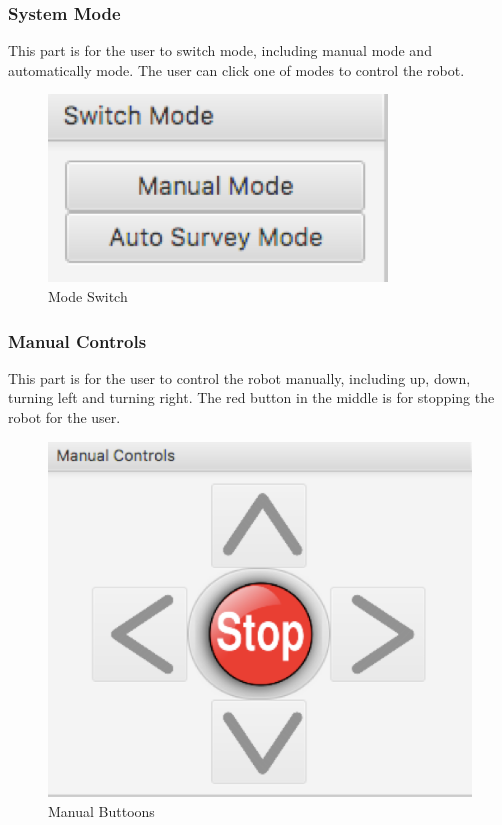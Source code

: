 \documentclass[10pt,a4paper,titlepage]{article}
\begin{document}
  \subsubsection{System Mode} 
  This part is for the user to switch mode, including manual mode and automatically mode. The user can click one of modes to control the robot.
  \begin{figure}[H] 
  \includegraphics[width=\linewidth]{mode.png}  %
  \caption{Mode Switch} 
  \label{fig:Mode Switch}               
  \end{figure} 
  
  \subsubsection{  Manual Controls} 
This part is for the user to control the robot manually, including up, down, turning left and turning right. The red button in the middle is for stopping the robot for the user.
  \begin{figure}[H] 
  \includegraphics[width=\linewidth]{buttons.png}  %
  \caption{Manual Buttoons} 
  \label{fig:Manual Buttoons}               
  \end{figure} 
   
\end{document}
